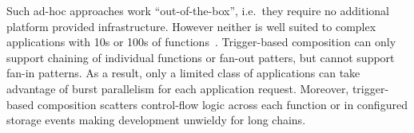 %







Such ad-hoc approaches work ``out-of-the-box'', i.e.\ they require no additional
platform provided infrastructure. However neither is well suited to complex
applications with 10s or 100s of functions~\cite{excamera, hello-retail}.
Trigger-based composition can only support chaining of individual functions or
fan-out patters, but cannot support fan-in patterns. As a result, only a limited
class of applications can take advantage of burst parallelism for each
application request. Moreover, trigger-based composition scatters control-flow
logic across each function or in configured storage events making development
unwieldy for long chains.


